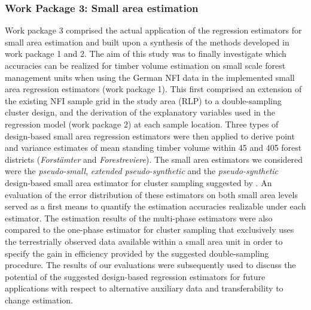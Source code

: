 
\subsubsection{Work Package 3: Small area estimation} %


Work package 3 comprised the actual application of the regression estimators for small area estimation and built upon a synthesis of the methods developed in work package 1 and 2. The aim of this study was to finally investigate which accuracies can be realized for timber volume estimation on small scale forest management units when using the German NFI data in the implemented small area regression estimators (work package 1). This first comprised an extension of the existing NFI sample grid in the study area (RLP) to a double-sampling cluster design, and the derivation of the explanatory variables used in the regression model (work package 2) at each sample location. Three types of design-based small area regression estimators were then applied to derive point and variance estimates of mean standing timber volume within 45 and 405 forest districts (\textit{Forst{\"a}mter} and \textit{Forestreviere}). The small area estimators we considered were the \textit{pseudo-small}, \textit{extended pseudo-synthetic} and the \textit{pseudo-synthetic} design-based small area estimator for cluster sampling suggested by \citet{mandallaz2013a, mandallaz2013b}. An evaluation of the error distribution of these estimators on both small area levels served as a first means to quantify the estimation accuracies realizable under each estimator. The estimation results of the multi-phase estimators were also compared to the one-phase estimator for cluster sampling that exclusively uses the terrestrially observed data available within a small area unit in order to specify the gain in efficiency provided by the suggested double-sampling procedure. The results of our evaluations were subsequently used to discuss the potential of the suggested design-based regression estimators for future applications with respect to alternative auxiliary data and transferability to change estimation.

